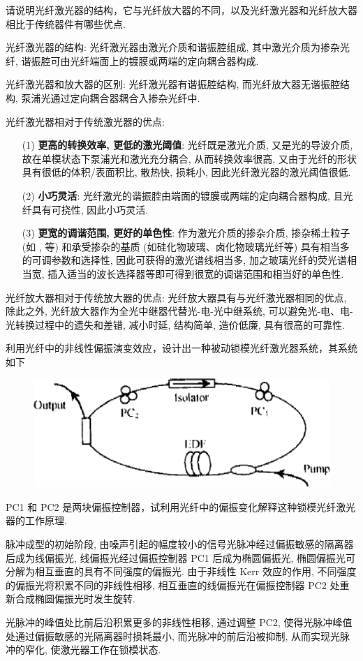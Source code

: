 \documentclass{assignment}
\begin{document}
\begin{prob}
    请说明光纤激光器的结构，它与光纤放大器的不同，以及光纤激光器和光纤放大器相比于传统器件有哪些优点.
\end{prob}
\begin{ans}
    光纤激光器的结构: 光纤激光器由激光介质和谐振腔组成, 其中激光介质为掺杂光纤, 谐振腔可由光纤端面上的镀膜或两端的定向耦合器构成.

    光纤激光器和放大器的区别: 光纤激光器有谐振腔结构, 而光纤放大器无谐振腔结构, 泵浦光通过定向耦合器耦合入掺杂光纤中.

    光纤激光器相对于传统激光器的优点:
    \begin{itemize}
        \item[(1)] \textbf{更高的转换效率, 更低的激光阈值}: 光纤既是激光介质, 又是光的导波介质, 故在单模状态下泵浦光和激光充分耦合, 从而转换效率很高, 又由于光纤的形状具有很低的体积/表面积比, 散热快, 损耗小, 因此光纤激光器的激光阈值很低.
        \item[(2)] \textbf{小巧灵活}: 光纤激光的谐振腔由端面的镀膜或两端的定向耦合器构成, 且光纤具有可挠性, 因此小巧灵活.
        \item[(3)] \textbf{更宽的调谐范围, 更好的单色性}: 作为激光介质的掺杂介质, 掺杂稀土粒子 (如 ,  等) 和承受掺杂的基质 (如硅化物玻璃、卤化物玻璃光纤等) 具有相当多的可调参数和选择性, 因此可获得的激光谱线相当多, 加之玻璃光纤的荧光谱相当宽, 插入适当的波长选择器等即可得到很宽的调谐范围和相当好的单色性.
    \end{itemize}

    光纤放大器相对于传统放大器的优点: 光纤放大器具有与光纤激光器相同的优点, 除此之外, 光纤放大器作为全光中继器代替光-电-光中继系统, 可以避免光-电、电-光转换过程中的遗失和差错, 减小时延, 结构简单, 造价低廉, 具有很高的可靠性.
\end{ans}

\begin{prob}
    利用光纤中的非线性偏振演变效应，设计出一种被动锁模光纤激光器系统，其系统如下
    \begin{figure}[H]
        \centering
        \includegraphics[width=.5\columnwidth]{5-1.png}
    \end{figure}
    PC1 和 PC2 是两块偏振控制器，试利用光纤中的偏振变化解释这种锁模光纤激光器的工作原理.
\end{prob}
\begin{ans}
    脉冲成型的初始阶段, 由噪声引起的幅度较小的信号光脉冲经过偏振敏感的隔离器后成为线偏振光, 线偏振光经过偏振控制器 PC1 后成为椭圆偏振光, 椭圆偏振光可分解为相互垂直的具有不同强度的偏振光. 由于非线性 Kerr 效应的作用, 不同强度的偏振光将积累不同的非线性相移, 相互垂直的线偏振光在偏振控制器 PC2 处重新合成椭圆偏振光时发生旋转.

    光脉冲的峰值处比前后沿积累更多的非线性相移, 通过调整 PC2, 使得光脉冲峰值处通过偏振敏感的光隔离器时损耗最小, 而光脉冲的前后沿被抑制, 从而实现光脉冲的窄化, 使激光器工作在锁模状态.
\end{ans}
\end{document}
